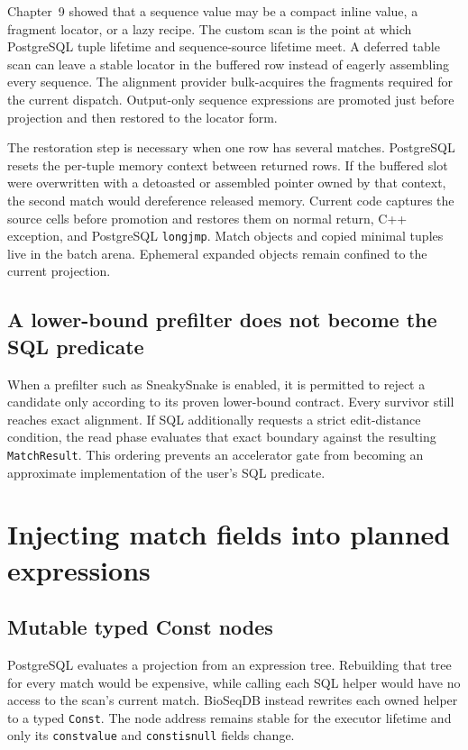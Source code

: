 Chapter~9 showed that a sequence value may be a compact inline value, a
fragment locator, or a lazy recipe.  The custom scan is the point at which
PostgreSQL tuple lifetime and sequence-source lifetime meet.  A deferred
table scan can leave a stable locator in the buffered row instead of eagerly
assembling every sequence.  The alignment provider bulk-acquires the
fragments required for the current dispatch.  Output-only sequence
expressions are promoted just before projection and then restored to the
locator form.

The restoration step is necessary when one row has several matches.
PostgreSQL resets the per-tuple memory context between returned rows.  If the
buffered slot were overwritten with a detoasted or assembled pointer owned by
that context, the second match would dereference released memory.  Current
code captures the source cells before promotion and restores them on normal
return, C++ exception, and PostgreSQL \texttt{longjmp}.  Match objects and
copied minimal tuples live in the batch arena.  Ephemeral expanded objects
remain confined to the current projection.

\subsection{A lower-bound prefilter does not become the SQL predicate}

When a prefilter such as SneakySnake is enabled, it is permitted to reject a
candidate only according to its proven lower-bound contract.  Every survivor
still reaches exact alignment.  If SQL additionally requests a strict
edit-distance condition, the read phase evaluates that exact boundary against
the resulting \texttt{MatchResult}.  This ordering prevents an accelerator
gate from becoming an approximate implementation of the user's SQL
predicate.

\section{Injecting match fields into planned expressions}
\label{sec:match-placeholder-injection}

\subsection{Mutable typed Const nodes}

PostgreSQL evaluates a projection from an expression tree.  Rebuilding that
tree for every match would be expensive, while calling each SQL helper would
have no access to the scan's current match.  BioSeqDB instead rewrites each
owned helper to a typed \texttt{Const}.  The node address remains stable for
the executor lifetime and only its \texttt{constvalue} and
\texttt{constisnull} fields change.

